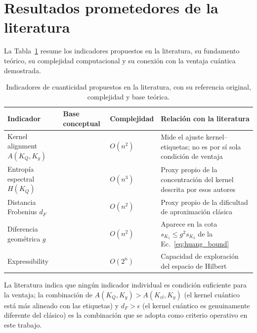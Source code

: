 \section{Resultados prometedores de la literatura}
\label{sec:lit_resultados}

La Tabla~\ref{tab:lit_indicadores} resume los indicadores propuestos en la literatura, su fundamento teórico, su complejidad computacional y su conexión con la ventaja cuántica demostrada.

\begin{table}[ht]
\centering
\small
\begin{tabular}{>{\raggedright\arraybackslash}p{3.1cm}>{\raggedright\arraybackslash}p{2.7cm}>{\raggedright\arraybackslash}p{2.5cm}>{\raggedright\arraybackslash}p{4.0cm}}
\hline
\textbf{Indicador} & \textbf{Base conceptual} & \textbf{Complejidad} & \textbf{Relación con la literatura} \\
\hline
Kernel alignment $A(K_Q, K_y)$ & \citet{cortes2012, huang2021} & $O(n^2)$ & Mide el ajuste kernel--etiquetas; no es por sí sola condición de ventaja \\
Entropía espectral $H(K_Q)$ & \citet{thanasilp2022} & $O(n^3)$ & Proxy propio de la concentración del kernel descrita por esos autores \\
Distancia Frobenius $d_F$ & \citet{liu2021} & $O(n^2)$ & Proxy propio de la dificultad de aproximación clásica \\
Diferencia geométrica $g$ & \citet{huang2021} & $O(n^2)$ & Aparece en la cota $s_{K_1}\leq g^2 s_{K_2}$ de la Ec.~\ref{eq:huang_bound} \\
Expressibility & \citet{sim2019} & $O(2^n)$ & Capacidad de exploración del espacio de Hilbert \\
\hline
\end{tabular}
\caption{Indicadores de cuanticidad propuestos en la literatura, con su referencia original, complejidad y base teórica.}
\label{tab:lit_indicadores}
\end{table}

La literatura \citep{huang2021, thanasilp2022, schuld2021kernels} indica que ningún indicador individual es condición suficiente para la ventaja; la combinación de $A(K_Q, K_y) > A(K_{cl}, K_y)$ (el kernel cuántico está más alineado con las etiquetas) y $d_F > \epsilon$ (el kernel cuántico es genuinamente diferente del clásico) es la combinación que se adopta como criterio operativo en este trabajo.

